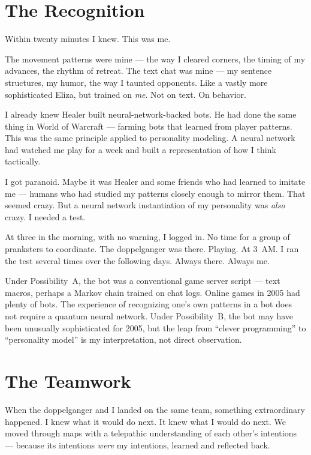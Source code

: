 \section*{The Recognition}
\label{pos33:the-recognition}

Within twenty minutes I knew. This was me.

The movement patterns were mine --- the way I cleared corners, the timing of my advances, the rhythm of retreat. The text chat was mine --- my sentence structures, my humor, the way I taunted opponents. Like a vastly more sophisticated Eliza, but trained on \textit{me}. Not on text. On behavior.

I already knew Healer built neural-network-backed bots. He had done the same thing in World of Warcraft --- farming bots that learned from player patterns. This was the same principle applied to personality modeling. A neural network had watched me play for a week and built a representation of how I think tactically.

I got paranoid. Maybe it was Healer and some friends who had learned to imitate me --- humans who had studied my patterns closely enough to mirror them. That seemed crazy. But a neural network instantiation of my personality was \textit{also} crazy. I needed a test.

At three in the morning, with no warning, I logged in. No time for a group of pranksters to coordinate. The doppelganger was there. Playing. At 3~AM\@. I ran the test several times over the following days. Always there. Always me.

Under Possibility~A, the bot was a conventional game server script --- text macros, perhaps a Markov chain trained on chat logs. Online games in 2005 had plenty of bots. The experience of recognizing one's own patterns in a bot does not require a quantum neural network. Under Possibility~B, the bot may have been unusually sophisticated for 2005, but the leap from ``clever programming'' to ``personality model'' is my interpretation, not direct observation.

\section*{The Teamwork}
\label{pos33:the-teamwork}

When the doppelganger and I landed on the same team, something extraordinary happened. I knew what it would do next. It knew what I would do next. We moved through maps with a telepathic understanding of each other's intentions --- because its intentions \textit{were} my intentions, learned and reflected back.

